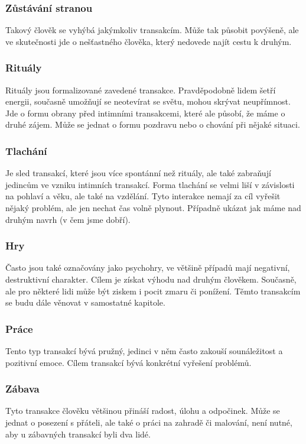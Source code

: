 \subsubsection*{Zůstávání stranou}
Takový člověk se vyhýbá jakýmkoliv transakcím. Může tak působit povýšeně, ale ve skutečnosti jde o nešťastného člověka, který nedovede najít cestu k druhým.

\subsubsection*{Rituály}
Rituály jsou formalizované zavedené transakce. 
Pravděpodobně lidem šetří energii, současně umožňují se neotevírat se světu, mohou skrývat neupřímnost. 
Jde o formu obrany před intimními transakcemi, které ale působí, že máme o druhé zájem. 
Může se jednat o formu pozdravu nebo o chování při nějaké situaci.

\subsubsection*{Tlachání}
Je sled transakcí, které jsou více spontánní než rituály, ale také zabraňují jedincům ve vzniku intimních transakcí. Forma tlachání se velmi liší v závislosti na pohlaví a věku, ale také na vzdělání. Tyto interakce nemají za cíl vyřešit nějaký problém, ale jen nechat čas volně plynout. Případně ukázat jak máme nad druhým navrh (v čem jsme dobří). 

\subsubsection*{Hry}
Často jsou také označovány jako psychohry, ve většině případů mají negativní, destruktivní charakter. Cílem je získat výhodu nad druhým člověkem. Současně, ale pro některé lidi může být ziskem i pocit zmaru či ponížení. Těmto transakcím se budu dále věnovat v samostatné kapitole.

\subsubsection*{Práce}
Tento typ transakcí bývá pružný, jedinci v něm často zakouší sounáležitost a pozitivní emoce. Cílem transakcí bývá konkrétní vyřešení problémů.

\subsubsection*{Zábava}
Tyto transakce člověku většinou přináší radost, úlohu a odpočinek.
Může se jednat o posezení s přáteli, ale také o práci na zahradě či malování, není nutné, aby u zábavných transakcí byli dva lidé.


